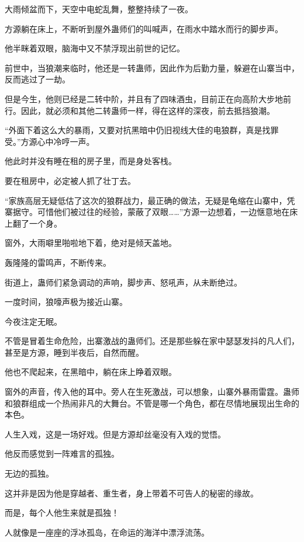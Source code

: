 
\begin{this_body}

大雨倾盆而下，天空中电蛇乱舞，整整持续了一夜。

方源躺在床上，不断听到屋外蛊师们的叫喊声，在雨水中踏水而行的脚步声。

他半眯着双眼，脑海中又不禁浮现出前世的记忆。

前世中，当狼潮来临时，他还是一转蛊师，因此作为后勤力量，躲避在山寨当中，反而逃过了一劫。

但是今生，他则已经是二转中阶，并且有了四味酒虫，目前正在向高阶大步地前行。因此，就必须和其他二转蛊师一样，得在这样的深夜，前去抵挡狼潮。

“外面下着这么大的暴雨，又要对抗黑暗中仍旧视线大佳的电狼群，真是找罪受。”方源心中冷哼一声。

他此时并没有睡在租的房子里，而是身处客栈。

要在租房中，必定被人抓了壮丁去。

“家族高层无疑低估了这次的狼群战力，最正确的做法，无疑是龟缩在山寨中，凭寨据守。可惜他们被过往的经验，蒙蔽了双眼……”方源一边想着，一边惬意地在床上翻了一个身。

窗外，大雨噼里啪啦地下着，绝对是倾天盖地。

轰隆隆的雷鸣声，不断传来。

街道上，蛊师们紧急调动的声响，脚步声、怒吼声，从未断绝过。

一度时间，狼嚎声极为接近山寨。

今夜注定无眠。

不管是冒着生命危险，出寨激战的蛊师们。还是那些躲在家中瑟瑟发抖的凡人们，甚至是方源，睡到半夜后，自然而醒。

他也不爬起来，在黑暗中，躺在床上睁着双眼。

窗外的声音，传入他的耳中。旁人在生死激战，可以想象，山寨外暴雨雷霆。蛊师和狼群组成一个热闹非凡的大舞台。不管是哪一个角色，都在尽情地展现出生命的本色。

人生入戏，这是一场好戏。但是方源却丝毫没有入戏的觉悟。

他反而感觉到一阵难言的孤独。

无边的孤独。

这并非是因为他是穿越者、重生者，身上带着不可告人的秘密的缘故。

而是，每个人他生来就是孤独！

人就像是一座座的浮冰孤岛，在命运的海洋中漂浮流荡。


\end{this_body}
